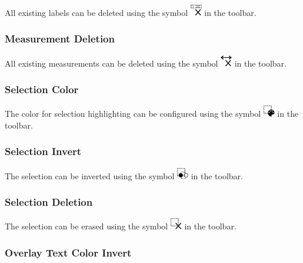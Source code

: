 {All existing labels can be deleted using the symbol \includegraphics[width=0.5cm]{../../data/icons/label_delete.png} in the toolbar.

\subsubsection{Measurement Deletion}

All existing measurements can be deleted using the symbol \includegraphics[width=0.5cm]{../../data/icons/measurement_delete.png} in the toolbar.

\subsubsection{Selection Color}

The color for selection highlighting can be configured using the symbol \includegraphics[width=0.5cm]{../../data/icons/select_color.png} in the toolbar.

\subsubsection{Selection Invert}

The selection can be inverted using the symbol \includegraphics[width=0.5cm]{../../data/icons/select_invert.png} in the toolbar.

\subsubsection{Selection Deletion}

The selection can be erased using the symbol \includegraphics[width=0.5cm]{../../data/icons/select_delete.png} in the toolbar.

\subsubsection{Overlay Text Color Invert}

}
